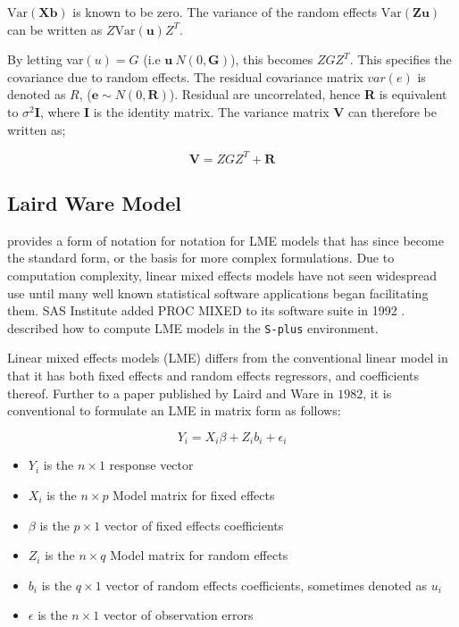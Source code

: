 \documentclass[12pt, a4paper]{report}
\theoremstyle{plain}
\theoremstyle{definition}
\theoremstyle{remark}
\begin{document}
$\mbox{Var}(\textbf{Xb})$ is known to be zero. The variance of the
random effects $\mbox{Var}(\textbf{Zu})$ can be written as
$Z\mbox{Var}(\textbf{u})Z^{T}$.

By letting var$(u) = G$ (i.e $\textbf{u} ~ N(0,\textbf{G})$), this
becomes $ZGZ^{T}$. This specifies the covariance due to random
effects. The residual covariance matrix $var(e)$ is denoted as
$R$, ($\textbf{e} \sim N(0,\textbf{R})$). Residual are uncorrelated,
hence \textbf{R} is equivalent to $\sigma^{2}$\textbf{I}, where
\textbf{I} is the identity matrix. The variance matrix \textbf{V}
can therefore be written as;

\begin{equation}
\textbf{V}  = ZGZ^{T} + \textbf{R}
\end{equation}

\subsection{Laird Ware Model} 
\citet{LW82} provides a form of notation for notation for LME models that has since become the standard form, or the basis for more complex formulations. Due to computation complexity, linear mixed effects models have not seen widespread use until many well known statistical software applications began facilitating them. SAS Institute added PROC MIXED to its software suite in 1992 \citep{singer}. \citet{PB} described how to compute LME models in the \texttt{S-plus} environment.

Linear mixed effects models (LME)
differs from the conventional linear model in that it has both
fixed effects and random effects regressors, and coefficients
thereof. Further to a paper published by Laird and Ware in $1982$,
it is conventional to formulate  an LME in matrix form as follows:

\begin{displaymath}
Y_{i} =X_{i}\beta + Z_{i}b_{i} + \epsilon_{i}
\end{displaymath}
\begin{itemize}
	\item $Y_{i}$ is the $n \times 1$ response vector \item $X_{i}$ is
	the $n \times p$ Model matrix for fixed effects \item $\beta$ is
	the $p \times 1$ vector of fixed effects coefficients \item
	$Z_{i}$ is the $n \times q$ Model matrix for random effects \item
	$b_{i}$ is the $q \times 1$ vector of random effects coefficients,
	sometimes denoted as $u_{i}$ \item $\epsilon$ is the $n \times 1$
	vector of observation errors
\end{itemize}
\end{document}
